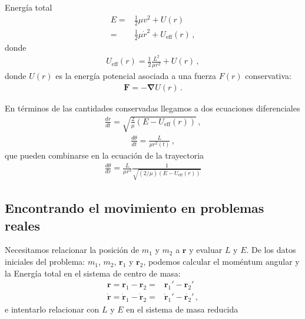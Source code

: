Energía total
\begin{align}
E=&\frac{1}{2}\mu v^2+U(r)\nonumber\\
 =& \frac{1}{2}\mu \dot{r}^2+U_{\text{eff}}(r)\,,
\end{align}
donde
\begin{align}
  U_{\text{eff}}(r)=\frac{1}{2}\frac{L^2}{\mu r^2}+U(r)\,,
\end{align}
donde $U(r)$ es la energía potencial asociada a una fuerza $F(r)$ conservativa:
\begin{align}
  \label{eq:fzacons}
  \mathbf{F}=-\boldsymbol{\nabla}U(r)\,.
\end{align}

En términos de las cantidades conservadas llegamos a dos ecuaciones diferenciales
\begin{align}
  \frac{dr}{dt}=\sqrt{\frac{2}{\mu}\left(E-U_{\text{eff}}(r)\right)}\,,
\end{align}
\begin{align}
  \frac{d\theta}{dt}=\frac{L}{\mu r^2(t)}\,,
\end{align}
que pueden combinarse en la ecuación de la trayectoria
\begin{align}
  \label{eq:traycent}
  \frac{d\theta}{dr}=\frac{L}{\mu r^2}\frac{1}{\sqrt{({2}/{\mu})\left(E-U_{\text{eff}}(r)\right)}}
\end{align}


\subsection{Encontrando el movimiento en problemas reales}
Necesitamos relacionar la posición de $m_1$ y $m_2$ a $\mathbf{r}$ y evaluar $L$ y $E$. De los datos iniciales del problema: $m_1$, $m_2$, $\mathbf{r}_1$ y $\mathbf{r}_2$, podemos calcular el moméntum angular y la Energía total en el sistema de centro de masa:
\begin{align}
  \label{eq:ecmfc}
  \mathbf{r}=\mathbf{r}_1-\mathbf{r}_2=&\mathbf{r}_1'-\mathbf{r}_2'\nonumber\\
  \dot{\mathbf{r}}=\dot{\mathbf{r}}_1-\dot{\mathbf{r}}_2=&\dot{\mathbf{r}}_1'-\dot{\mathbf{r}_2}'\,,
\end{align}
e intentarlo relacionar con $L$ y $E$ en el sistema de masa reducida

